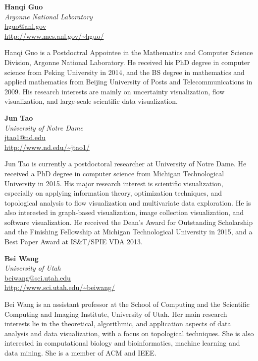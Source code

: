 \documentclass[preprint,journal]{vgtc}       %
\newcommand{\addverticalspace}{\vspace{3mm}}
\begin{document}
\printbibliography[title={Relevant Publications},category=Garth]

\noindent \textbf{Hanqi Guo}\\
\emph{Argonne National Laboratory}\\
\href{mailto:hguo@anl.gov}{hguo@anl.gov}\\
\url{http://www.mcs.anl.gov/~hguo/}

\addverticalspace

Hanqi Guo is a Postdoctral Appointee in the Mathematics and Computer Science Division, Argonne National Laboratory. He received his PhD degree in computer science from Peking University in 2014, and the BS degree in mathematics and applied mathematics from Beijing University of Posts and Telecommunications in 2009. His research interests are mainly on uncertainty visualization, flow visualization, and large-scale scientific data visualization.

\printbibliography[title={Relevant Publications},category=Guo]

\noindent \textbf{Jun Tao}\\
\emph{University of Notre Dame}\\
\href{mailto:jtao1@nd.edu}{jtao1@nd.edu}\\
\url{http://www.nd.edu/~jtao1/}

\addverticalspace

Jun Tao is currently a postdoctoral researcher at University of Notre Dame. He received a PhD degree in computer science from Michigan Technological University in 2015. His major research interest is scientific visualization, especially on applying information theory, optimization techniques, and topological analysis to flow visualization and multivariate data exploration. He is also interested in graph-based visualization, image collection visualization, and software visualization. He received the Dean’s Award for Outstanding Scholarship and the Finishing Fellowship at Michigan Technological University in 2015, and a Best Paper Award at IS\&T/SPIE VDA 2013.

\printbibliography[title={Relevant Publications},category=Tao]

\noindent \textbf{Bei Wang}\\
\emph{University of Utah}\\
\href{mailto:beiwang@sci.utah.edu}{beiwang@sci.utah.edu}\\
\url{http://www.sci.utah.edu/~beiwang/}

\addverticalspace
Bei Wang is an assistant professor at the School of Computing and the Scientific Computing and Imaging Institute, University of Utah. Her main research interests lie in the theoretical, algorithmic, and application aspects of data analysis and data visualization, with a focus on topological techniques. She is also interested in computational biology and bioinformatics, machine learning and data mining. She is a member of ACM and IEEE.
\addverticalspace
\end{document}
